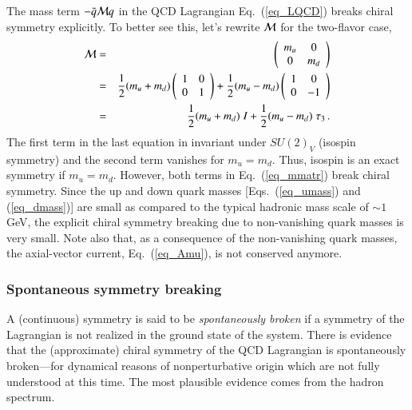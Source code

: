 \documentclass[sort&compress,preprint,3p]{elsarticle}
\begin{document}
The mass term  
 $- \bar{q}{\cal M}q$
in the QCD Lagrangian Eq.~(\ref{eq_LQCD}) 
breaks chiral symmetry explicitly. To better see this,
let's rewrite ${\cal M}$ for the two-flavor case,
\begin{eqnarray}
{\cal M} & = & 
\left( \begin{array}{cc}
            m_u & 0 \\
              0  & m_d 
           \end{array} \right)  \nonumber \\
  & = & \frac12 (m_u+m_d) 
\left( \begin{array}{cc}
            1 & 0 \\
              0  & 1 
           \end{array} \right) 
+ \frac12 (m_u-m_d) 
\left( \begin{array}{cc}
            1 & 0 \\
              0  & -1 
           \end{array} \right)  \nonumber \\
 & = & \frac12 (m_u+m_d) \; I + \frac12 (m_u-m_d) \; \tau_3 \,.
\label{eq_mmatr}
\end{eqnarray}
The first term in the last equation in invariant under $SU(2)_V$
(isospin symmetry) and the second term vanishes for
$m_u=m_d$.
Thus, isospin is an exact symmetry if 
$m_u=m_d$.
However, both terms in Eq.~(\ref{eq_mmatr}) break chiral symmetry.
Since the up and down quark masses
[Eqs.~(\ref{eq_umass}) and (\ref{eq_dmass})]
are small as compared to
the typical hadronic mass scale of $\sim 1$ GeV,
the explicit chiral symmetry breaking due to non-vanishing
quark masses is very small.
Note also that, as a consequence of the non-vanishing quark masses,
the axial-vector current, Eq.~(\ref{eq_Amu}),
is not conserved anymore.

\subsubsection{Spontaneous symmetry breaking}

A (continuous) symmetry is said to be {\it spontaneously
broken} if a symmetry of the Lagrangian 
is not realized in the ground state of the system.
There is evidence that the (approximate) chiral
symmetry of the QCD Lagrangian is spontaneously 
broken---for dynamical reasons of nonperturbative origin
which are not fully understood at this time.
The most plausible evidence comes from the hadron spectrum.
\end{document}

